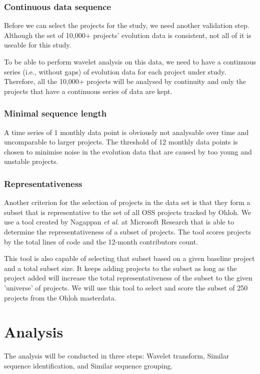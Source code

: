 \subsubsection{Continuous data sequence}
Before we can select the projects for the study, we need another validation
step. Although the set of 10,000+ projects' evolution data is consistent, not
all of it is useable for this study.

To be able to perform wavelet analysis on this data, we need to have a
continuous series (i.e., without gaps) of evolution data for each project under
study. Therefore, all the 10,000+ projects will be analysed by continuity and
only the projects that have a continuous series of data are kept.

\subsubsection{Minimal sequence length}
A time series of 1 monthly data point is obviously not analysable over time and
uncomparable to larger projects. The threshold of 12 monthly data points is
chosen to minimise noise in the evolution data that are caused by too young and
unstable projects.

\subsubsection{Representativeness}
Another criterion for the selection of projects in the data set is that they
form a subset that is representative to the set of all OSS projects tracked by
Ohloh. We use a tool created by Nagappan \emph{et al. }\rm\cite{nagappan} at
Microsoft Research that is able to determine the representativeness of a subset of
projects. The tool scores projects by the total lines of code and the 12-month
contributors count.

This tool is also capable of selecting that subset based on a given baseline
project and a total subset size. It keeps adding projects to the subset as long
as the project added will increase the total representativeness of the subset
to the given 'universe' of projects. We will use this tool to select and score
the subset of 250 projects from the Ohloh masterdata.



\section{Analysis}
The analysis will be conducted in three steps: Wavelet transform, Similar
sequence identification, and Similar sequence grouping.

